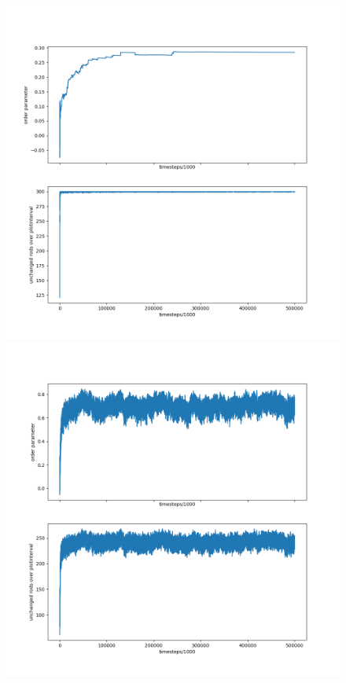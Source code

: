 \begin{figure}[h]
  \begin{minipage}[t]{0.45\textwidth}
    \hspace{-0.1\textwidth}
    \includegraphics[width=1.2\textwidth]{data/sca_comp2_L.png}
  \end{minipage}
  \hfill
  \begin{minipage}[t]{0.45\textwidth}
    \includegraphics[width=1.2\textwidth]{data/sca_comp2_R.png}

\end{minipage}
\end{figure}
